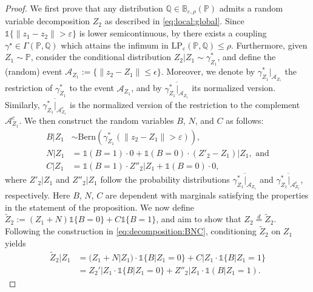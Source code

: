 \documentclass[11pt,a4paper]{article}
\begin{document}
\begin{proof}
We first prove that any distribution $\mathbb Q \in \mathbb B_{\varepsilon,\rho}(\mathbb P)$ admits a random variable decomposition $Z_2$ as described in \eqref{eq:local:global}. Since $\mathds{1}\{\|z_1-z_2\|>\varepsilon\}$ is lower semicontinuous, by \cite[Theorem 4.1]{villani2009optimal} there exists a coupling $\gamma^\star\in\Gamma(\mathbb P, \mathbb Q)$ which attains the infimum in $\text{LP}_\varepsilon(\mathbb P,\mathbb Q) \leq \rho$. Furthermore, given $Z_1 \sim \mathbb P$, consider the conditional distribution $Z_2|Z_1\sim\gamma^*_{Z_1}$, and define the (random) event $\mathcal{A}_{Z_1} := \{\|z_2-Z_1\|\leq \epsilon\}$. Moreover, we denote by $\gamma^*_{Z_1}|_{\mathcal{A}_{Z_1}}$ the restriction of $\gamma^*_{Z_1}$ to the event $\mathcal{A}_{Z_1}$, and by $\overline{\gamma^*_{Z_1}|_{\mathcal{A}_{Z_1}}}$ its normalized version. Similarly, $\overline{\gamma^*_{Z_1}|_{\mathcal{A}_{Z_1}^c }}$ is the normalized version of the restriction to the complement $\mathcal{A}_{Z_1}^c$. We then construct the random variables $B$, $N$, and $C$ as follows:
\begin{equation}
\begin{aligned}
    B|Z_1&\sim\text{Bern}\left(\gamma^*_{Z_1} \left(\|z_2-Z_1\|>\varepsilon \right) \right),\\
    N|Z_1 &= \mathds{1}(B=1)\cdot 0+\mathds{1}(B=0)\cdot (Z'_2-Z_1)|Z_1, \text{ and}\\
    C|Z_1 &= \mathds{1}(B=1)\cdot Z''_2|Z_1+\mathds{1}(B=0)\cdot 0,\label{eq:decomposition:BNC}
\end{aligned}
\end{equation}
where $Z'_2|Z_1$ and $Z''_2|Z_1$ follow the probability distributions $\overline{\gamma^*_{Z_1}|_{\mathcal{A}_{Z_1}}}$ and $\overline{\gamma^*_{Z_1}|_{\mathcal{A}_{Z_1}^c}}$, respectively. Here $B$, $N$, $C$ are dependent with marginals satisfying the properties in the statement of the proposition. We now define $\widetilde{Z}_2 := (Z_1 + N)\mathds{1}\{B = 0\} + C \mathds{1}\{B = 1\}$, and aim to show that $Z_2\overset{d}{=}\widetilde{Z}_2$. Following the construction in \eqref{eq:decomposition:BNC}, conditioning $\widetilde{Z}_2$ on $Z_1$ yields
\begin{align*}
    \widetilde{Z}_2|Z_1& = (Z_1 + N|Z_1)\cdot\mathds{1}\{B|Z_1 = 0\}+C|Z_1\cdot\mathds{1}\{B|Z_1 = 1\}\\
    &=Z_2'|Z_1\cdot\mathds{1}\{B|Z_1 = 0\}+Z''_2|Z_1 \cdot \mathds{1}(B|Z_1=1).
\end{align*}

\end{proof}
\end{document}
